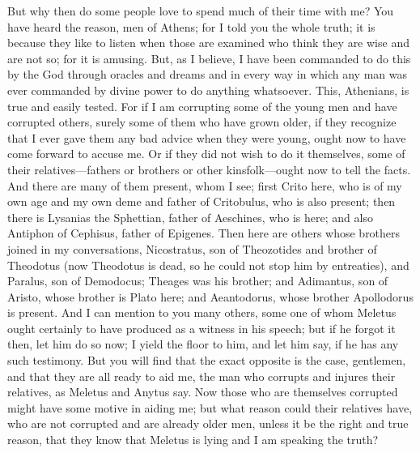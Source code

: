 But why then do some people love  to spend much of their time with me? You have heard the reason, men of Athens; for I told you the whole truth; it is because they like to listen when those are examined who think they are wise and are not so; for it is amusing. But, as I believe, I have been commanded to do this by the God through oracles and dreams and in every way in which any man was ever commanded by divine power to do anything whatsoever. This, Athenians, is true and easily tested. For if I am corrupting some of the young men  and have corrupted others, surely some of them who have grown older, if they recognize that I ever gave them any bad advice when they were young, ought now to have come forward to accuse me. Or if they did not wish to do it themselves, some of their relatives—fathers or brothers or other kinsfolk—ought now to tell the facts. And there are many of them present, whom I see; first Crito here,  who is of my own age and my own deme and father of Critobulus, who is also present; then there is Lysanias the Sphettian, father of Aeschines, who is here; and also Antiphon of Cephisus, father of Epigenes. Then here are others whose brothers joined in my conversations, Nicostratus, son of Theozotides and brother of Theodotus (now Theodotus is dead, so he could not stop him by entreaties), and Paralus, son of Demodocus; Theages was his brother; and  Adimantus, son of Aristo, whose brother is Plato here; and Aeantodorus, whose brother Apollodorus is present. And I can mention to you many others, some one of whom Meletus ought certainly to have produced as a witness in his speech; but if he forgot it then, let him do so now; I yield the floor to him, and let him say, if he has any such testimony. But you will find that the exact opposite is the case, gentlemen, and that they are all ready to aid me, the man who corrupts and injures their relatives, as Meletus and Anytus say.  Now those who are themselves corrupted might have some motive in aiding me; but what reason could their relatives have, who are not corrupted and are already older men, unless it be the right and true reason, that they know that Meletus is lying and I am speaking the truth?

